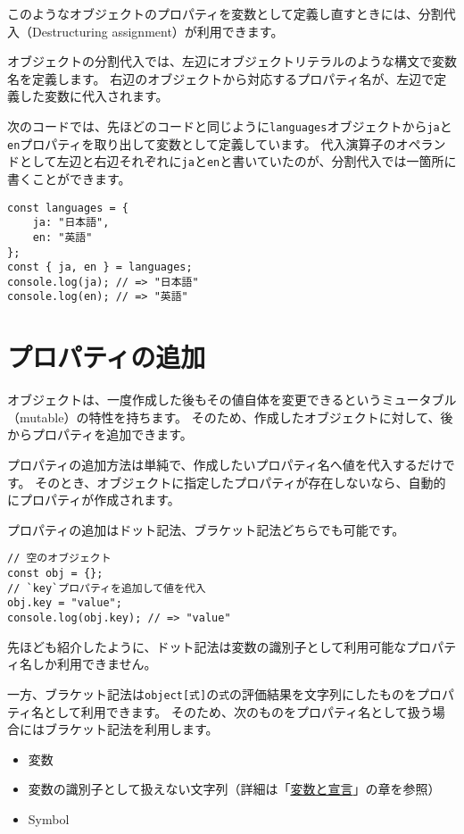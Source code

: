 このようなオブジェクトのプロパティを変数として定義し直すときには、分割代入（Destructuring
assignment）が利用できます。

オブジェクトの分割代入では、左辺にオブジェクトリテラルのような構文で変数名を定義します。
右辺のオブジェクトから対応するプロパティ名が、左辺で定義した変数に代入されます。

次のコードでは、先ほどのコードと同じように\texttt{languages}オブジェクトから\texttt{ja}と\texttt{en}プロパティを取り出して変数として定義しています。
代入演算子のオペランドとして左辺と右辺それぞれに\texttt{ja}と\texttt{en}と書いていたのが、分割代入では一箇所に書くことができます。

\begin{lstlisting}
const languages = {
    ja: "日本語",
    en: "英語"
};
const { ja, en } = languages;
console.log(ja); // => "日本語"
console.log(en); // => "英語"
\end{lstlisting}

\hypertarget{add-property}{%
\section{プロパティの追加}\label{add-property}}

オブジェクトは、一度作成した後もその値自体を変更できるというミュータブル（mutable）の特性を持ちます。
そのため、作成したオブジェクトに対して、後からプロパティを追加できます。

プロパティの追加方法は単純で、作成したいプロパティ名へ値を代入するだけです。
そのとき、オブジェクトに指定したプロパティが存在しないなら、自動的にプロパティが作成されます。

プロパティの追加はドット記法、ブラケット記法どちらでも可能です。

\begin{lstlisting}
// 空のオブジェクト
const obj = {};
// `key`プロパティを追加して値を代入
obj.key = "value";
console.log(obj.key); // => "value"
\end{lstlisting}

先ほども紹介したように、ドット記法は変数の識別子として利用可能なプロパティ名しか利用できません。

一方、ブラケット記法は\texttt{object[式]}の\texttt{式}の評価結果を文字列にしたものをプロパティ名として利用できます。
そのため、次のものをプロパティ名として扱う場合にはブラケット記法を利用します。

\begin{itemize}
\item
  変数
\item
  変数の識別子として扱えない文字列（詳細は「\href{../variables/README.md}{変数と宣言}」の章を参照）
\item
  Symbol
\end{itemize}

